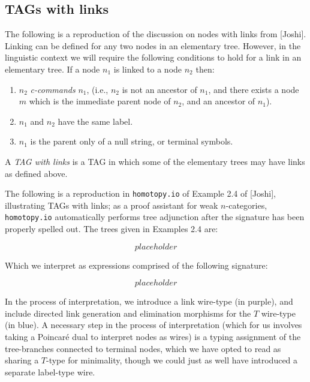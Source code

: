 \begin{fullwidth}
\subsection{TAGs with links}

\begin{defn}
The following is a reproduction of the discussion on nodes with links from [Joshi]. Linking can be defined for any two nodes in an elementary tree. However, in the linguistic context we will require the following conditions to hold for a link in an elementary tree. If a node $n_1$ is linked to a node $n_2$ then:
\begin{enumerate}
\item{$n_2$ \emph{c-commands} $n_1$, (i.e., $n_2$ is not an ancestor of $n_1$, and there exists a node $m$ which is the immediate parent node of $n_2$, and an ancestor of $n_1$).}
\item{$n_1$ and $n_2$ have the same label.}
\item{$n_1$ is the parent only of a null string, or terminal symbols.}
\end{enumerate}
A \emph{TAG with links} is a TAG in which some of the elementary trees may have links as defined above.
\end{defn}

\begin{example}
The following is a reproduction in \texttt{homotopy.io} of Example 2.4 of [Joshi], illustrating TAGs with links; as a proof assistant for weak $n$-categories, \texttt{homotopy.io} automatically performs tree adjunction after the signature has been properly spelled out. The trees given in Examples 2.4 are:

\[placeholder\]

Which we interpret as expressions comprised of the following signature:

\[placeholder\]

In the process of interpretation, we introduce a link wire-type (in purple), and include directed link generation and elimination morphisms for the $T$ wire-type (in blue). A necessary step in the process of interpretation (which for us involves taking a Poincar\'{e} dual to interpret nodes as wires) is a typing assignment of the tree-branches connected to terminal nodes, which we have opted to read as sharing a $T$-type for minimality, though we could just as well have introduced a separate label-type wire.

\[\]
\[\]
\[\]
\[\]


\end{example}
\end{fullwidth}
